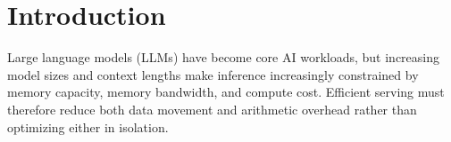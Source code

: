 \documentclass[sigconf,anonymous,nonacm]{acmart}
\newcommand{\wkv}{WKV}
\begin{document}
\maketitle

\section{Introduction}


Large language models (LLMs) have become core AI workloads, but increasing model sizes and context lengths make inference increasingly constrained by memory capacity, memory bandwidth, and compute cost. Efficient serving must therefore reduce both data movement and arithmetic overhead rather than optimizing either in isolation.
\end{document}
